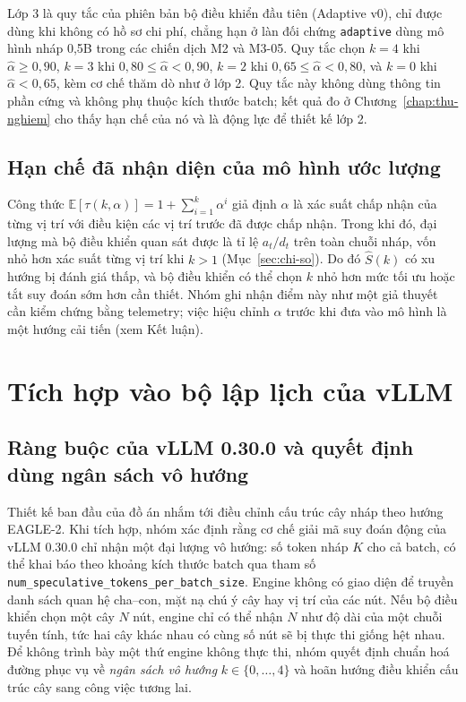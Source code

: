 Lớp 3 là quy tắc của phiên bản bộ điều khiển đầu tiên (Adaptive v0), chỉ được dùng khi không có hồ sơ chi phí, chẳng hạn ở làn đối chứng \texttt{adaptive} dùng mô hình nháp 0,5B trong các chiến dịch M2 và M3-05. Quy tắc chọn $k=4$ khi $\hat{\alpha} \ge 0{,}90$, $k=3$ khi $0{,}80 \le \hat{\alpha} < 0{,}90$, $k=2$ khi $0{,}65 \le \hat{\alpha} < 0{,}80$, và $k=0$ khi $\hat{\alpha} < 0{,}65$, kèm cơ chế thăm dò như ở lớp 2. Quy tắc này không dùng thông tin phần cứng và không phụ thuộc kích thước batch; kết quả đo ở Chương~\ref{chap:thu-nghiem} cho thấy hạn chế của nó và là động lực để thiết kế lớp 2.

\subsection{Hạn chế đã nhận diện của mô hình ước lượng}

Công thức $\mathbb{E}[\tau(k,\alpha)] = 1+\sum_{i=1}^{k}\alpha^{i}$ giả định $\alpha$ là xác suất chấp nhận của từng vị trí với điều kiện các vị trí trước đã được chấp nhận. Trong khi đó, đại lượng mà bộ điều khiển quan sát được là tỉ lệ $a_t/d_t$ trên toàn chuỗi nháp, vốn nhỏ hơn xác suất từng vị trí khi $k>1$ (Mục~\ref{sec:chi-so}). Do đó $\hat{S}(k)$ có xu hướng bị đánh giá thấp, và bộ điều khiển có thể chọn $k$ nhỏ hơn mức tối ưu hoặc tắt suy đoán sớm hơn cần thiết. Nhóm ghi nhận điểm này như một giả thuyết cần kiểm chứng bằng telemetry; việc hiệu chỉnh $\alpha$ trước khi đưa vào mô hình là một hướng cải tiến (xem Kết luận).

\section{Tích hợp vào bộ lập lịch của vLLM}
\label{sec:tich-hop}

\subsection{Ràng buộc của vLLM 0.30.0 và quyết định dùng ngân sách vô hướng}

Thiết kế ban đầu của đồ án nhắm tới điều chỉnh cấu trúc cây nháp theo hướng EAGLE-2. Khi tích hợp, nhóm xác định rằng cơ chế giải mã suy đoán động của vLLM 0.30.0 chỉ nhận một đại lượng vô hướng: số token nháp $K$ cho cả batch, có thể khai báo theo khoảng kích thước batch qua tham số \texttt{num\_speculative\_tokens\_per\_batch\_size}. Engine không có giao diện để truyền danh sách quan hệ cha--con, mặt nạ chú ý cây hay vị trí của các nút. Nếu bộ điều khiển chọn một cây $N$ nút, engine chỉ có thể nhận $N$ như độ dài của một chuỗi tuyến tính, tức hai cây khác nhau có cùng số nút sẽ bị thực thi giống hệt nhau. Để không trình bày một thứ engine không thực thi, nhóm quyết định chuẩn hoá đường phục vụ về \emph{ngân sách vô hướng} $k \in \{0,\dots,4\}$ và hoãn hướng điều khiển cấu trúc cây sang công việc tương lai.

